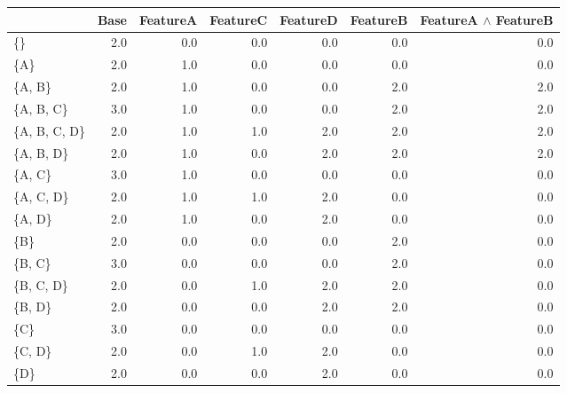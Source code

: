         \begin{tabular}{lrrrrrr}
            \toprule
            {} &  Base &  FeatureA &  FeatureC &  FeatureD &  FeatureB &  FeatureA $\land$ FeatureB \\
            \midrule
            \{\}           &   2.0 &       0.0 &       0.0 &       0.0 &       0.0 &                   0.0 \\
            \{A\}          &   2.0 &       1.0 &       0.0 &       0.0 &       0.0 &                   0.0 \\
            \{A, B\}       &   2.0 &       1.0 &       0.0 &       0.0 &       2.0 &                   2.0 \\
            \{A, B, C\}    &   3.0 &       1.0 &       0.0 &       0.0 &       2.0 &                   2.0 \\
            \{A, B, C, D\} &   2.0 &       1.0 &       1.0 &       2.0 &       2.0 &                   2.0 \\
            \{A, B, D\}    &   2.0 &       1.0 &       0.0 &       2.0 &       2.0 &                   2.0 \\
            \{A, C\}       &   3.0 &       1.0 &       0.0 &       0.0 &       0.0 &                   0.0 \\
            \{A, C, D\}    &   2.0 &       1.0 &       1.0 &       2.0 &       0.0 &                   0.0 \\
            \{A, D\}       &   2.0 &       1.0 &       0.0 &       2.0 &       0.0 &                   0.0 \\
            \{B\}          &   2.0 &       0.0 &       0.0 &       0.0 &       2.0 &                   0.0 \\
            \{B, C\}       &   3.0 &       0.0 &       0.0 &       0.0 &       2.0 &                   0.0 \\
            \{B, C, D\}    &   2.0 &       0.0 &       1.0 &       2.0 &       2.0 &                   0.0 \\
            \{B, D\}       &   2.0 &       0.0 &       0.0 &       2.0 &       2.0 &                   0.0 \\
            \{C\}          &   3.0 &       0.0 &       0.0 &       0.0 &       0.0 &                   0.0 \\
            \{C, D\}       &   2.0 &       0.0 &       1.0 &       2.0 &       0.0 &                   0.0 \\
            \{D\}          &   2.0 &       0.0 &       0.0 &       2.0 &       0.0 &                   0.0 \\
            \bottomrule
            \end{tabular}
            